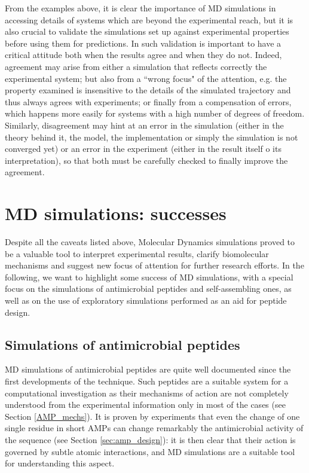 From the examples above, it is clear the importance of MD simulations in accessing details of systems which are beyond the experimental reach, but it is also crucial to validate the simulations set up against experimental properties before using them for predictions.
%
In such validation is important to have a critical attitude both when the results agree and when they do not.
%
Indeed, agreement may arise from either a simulation that reflects correctly the experimental system; but also from a ``wrong focus" of the attention, e.g. the property examined is insensitive to the details of the simulated trajectory and thus always agrees with experiments; or finally from a compensation of errors, which happens more easily for systems with a high number of degrees of freedom.
%
Similarly, disagreement may hint at an error in the simulation (either in the theory behind it, the model, the implementation or simply the simulation is not converged yet) or an error in the experiment (either in the result itself o its interpretation), so that both must be carefully checked to finally improve the agreement.


\section{MD simulations: successes} \label{sec:md_lit}

Despite all the caveats listed above, Molecular Dynamics simulations proved to be a valuable tool to interpret experimental results, clarify biomolecular mechanisms and suggest new focus of attention for further research efforts.
%
In the following, we want to highlight some success of MD simulations, with a special focus on the simulations of antimicrobial peptides and self-assembling ones, as well as on the use of exploratory simulations performed as an aid for peptide design.


\subsection{Simulations of antimicrobial peptides}
MD simulations of antimicrobial peptides are quite well documented since the first developments of the technique. Such peptides are a suitable system for a computational investigation as their mechanisms of action are not completely understood from the experimental information only in most of the cases (see Section \ref{AMP_mechs}). It is proven by experiments that even the change of one single residue in short AMPs can change remarkably the antimicrobial activity of the sequence (see Section \ref{sec:amp_design}): it is then clear that their action is governed by subtle atomic interactions, and MD simulations are a suitable tool for understanding this aspect.

